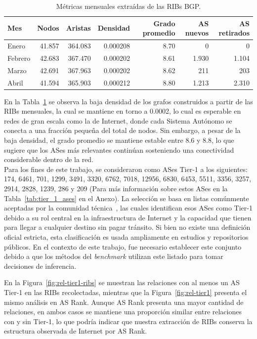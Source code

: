 \begin{table}[htbp]
\centering
\begin{tabular}{lrrrrrr}
\toprule
Mes & Nodos & Aristas & Densidad & Grado promedio & AS nuevos & AS retirados \\
\midrule
Enero    & 41.857 & 364.083 & 0.000208 & 8.70 & 0    & 0    \\
Febrero  & 42.683 & 367.470 & 0.000202 & 8.61 & 1.930 & 1.104 \\
Marzo    & 42.691 & 367.963 & 0.000202 & 8.62 & 211  & 203  \\
Abril    & 41.594 & 365.903 & 0.000212 & 8.80 & 1.213 & 2.310 \\
\bottomrule
\end{tabular}
\caption{Métricas mensuales extraídas de las RIBs BGP.}
\label{tab:caracteristicas_ribs_por_mes}
\end{table}


En la Tabla~\ref{tab:caracteristicas_ribs_por_mes} se observa la baja densidad de los grafos construidos a partir de las RIBs mensuales, la cual se mantiene en torno a 0.0002, lo cual es esperable en redes de gran escala como la de Internet, donde cada Sistema Autónomo se conecta a una fracción pequeña del total de nodos. Sin embargo, a pesar de la baja densidad, el grado promedio se mantiene estable entre 8.6 y 8.8, lo que sugiere que los ASes más relevantes continúan sosteniendo una conectividad considerable dentro de la red.\\




Para los fines de este trabajo, se consideraron como ASes Tier-1 a los siguientes: 174, 6461, 701, 1299, 3491, 3320, 6762, 7018, 12956, 6830, 6453, 5511, 3356, 3257, 2914, 2828, 1239, 286 y 209 (Para más información sobre estos ASes en la Tabla~\ref{tab:tier_1_ases} en el Anexo). La selección se basa en listas comúnmente aceptadas por la comunidad técnica~\cite{wikipedia_tier1}, las cuales identifican esos ASes como Tier-1 debido a su rol central en la infraestructura de Internet y la capacidad que tienen para llegar a cualquier destino sin pagar tránsito. Si bien no existe una definición oficial estricta, esta clasificación es usada ampliamente en estudios y repositorios públicos. En el contexto de este trabajo, fue necesario establecer este conjunto debido a que los métodos del \textit{benchmark} utilizan este listado para tomar decisiones de inferencia.



En la Figura~\ref{fig:rel-tier1-ribs} se muestran las relaciones con al menos un AS Tier-1 en las RIBs recolectadas, mientras que la Figura~\ref{fig:rel-tier1} presenta el mismo análisis en AS Rank. Aunque AS Rank presenta una mayor cantidad de relaciones, en ambos casos se mantiene una proporción similar entre relaciones con y sin Tier-1, lo que podría indicar que nuestra extracción de RIBs conserva la estructura observada de Internet por AS Rank.\\


